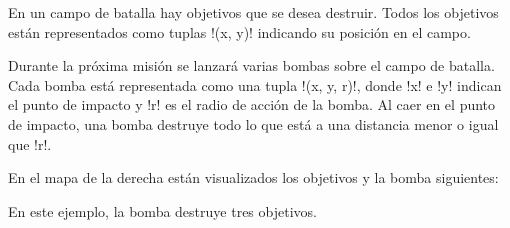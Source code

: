 En un campo de batalla
hay objetivos que se desea destruir.
Todos los objetivos están representados
como tuplas \li!(x, y)!
indicando su posición en el campo.

Durante la próxima misión
se lanzará varias bombas sobre el campo de batalla.
Cada bomba está representada
como una tupla \li!(x, y, r)!,
donde \li!x! e \li!y! indican el punto de impacto
y \li!r! es el radio de acción de la bomba.
Al caer en el punto de impacto,
una bomba destruye todo lo que está
a una distancia menor o igual que \li!r!.

\begin{minipage}{.70\textwidth}
  En el mapa de la derecha están visualizados
  los objetivos y la bomba siguientes:
  
  En este ejemplo,
  la bomba destruye tres objetivos.
\end{minipage}
\hfill
\begin{minipage}{.25\textwidth}
  \hfill
\end{minipage}

